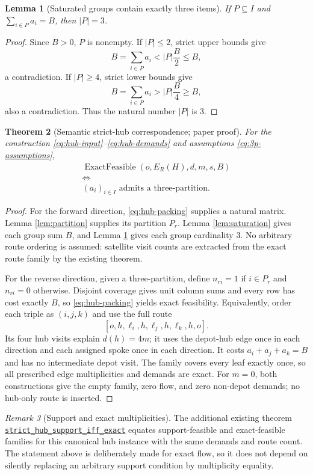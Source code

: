 \documentclass[11pt]{article}
\newtheorem{theorem}{Theorem}[section]
\newtheorem{lemma}[theorem]{Lemma}
\theoremstyle{remark}
\newtheorem{remark}[theorem]{Remark}
\newcommand{\EF}{\operatorname{ExactFeasible}}
\newcommand{\code}[1]{\nolinkurl{#1}}
\newcommand{\src}[2]{\href{https://github.com/huam54925-cpu/uav-routing-certification/blob/1bc992475a9bd515d77245e2bc0471e5ecab2fd5/LeanCompletion/UAV/#1.lean}{#2}}
\begin{document}
\begin{lemma}[Saturated groups contain exactly three items]\label{lem:three}
If $P\subseteq I$ and $\sum_{i\in P}a_i=B$, then $|P|=3$.
\end{lemma}
\begin{proof}
Since $B>0$, $P$ is nonempty. If $|P|\leq2$, strict upper bounds give
\[
 B=\sum_{i\in P}a_i<|P|\frac B2\leq B,
\]
a contradiction. If $|P|\geq4$, strict lower bounds give
\[
 B=\sum_{i\in P}a_i>|P|\frac B4\geq B,
\]
also a contradiction. Thus the natural number $|P|$ is $3$.
\end{proof}

\begin{theorem}[Semantic strict-hub correspondence; paper proof]\label{thm:hub}
For the construction \eqref{eq:hub-input}--\eqref{eq:hub-demands} and assumptions \eqref{eq:3p-assumptions},
\[
 \boxed{\begin{gathered}
   \EF(o,E_R(H),d,m,s,B)\\
   \Longleftrightarrow\\
   (a_i)_{i\in I}\text{ admits a three-partition}.
 \end{gathered}}
\]
\end{theorem}
\begin{proof}
For the forward direction, \eqref{eq:hub-packing} supplies a natural matrix.
Lemma \ref{lem:partition} supplies its partition $P_r$.
Lemma \ref{lem:saturation} gives each group sum $B$, and Lemma \ref{lem:three} gives each group cardinality $3$.
No arbitrary route ordering is assumed: satellite visit counts are extracted from the exact route family by the existing theorem.

For the reverse direction, given a three-partition, define $n_{ri}=1$ if $i\in P_r$ and $n_{ri}=0$ otherwise.
Disjoint coverage gives unit column sums and every row has cost exactly $B$, so \eqref{eq:hub-packing} yields exact feasibility.
Equivalently, order each triple as $(i,j,k)$ and use the full route
\[
 [o,h,\ell_i,h,\ell_j,h,\ell_k,h,o].
\]
Its four hub visits explain $d(h)=4m$; it uses the depot-hub edge once in each direction and each assigned spoke once in each direction.
It costs $a_i+a_j+a_k=B$ and has no intermediate depot visit.
The family covers every leaf exactly once, so all prescribed edge multiplicities and demands are exact.
For $m=0$, both constructions give the empty family, zero flow, and zero non-depot demands; no hub-only route is inserted.
\end{proof}

\begin{remark}[Support and exact multiplicities]
The additional existing theorem
\src{HubSpokeSupportExact}{\code{strict_hub_support_iff_exact}}
equates support-feasible and exact-feasible families for this canonical hub instance with the same demands and route count.
The statement above is deliberately made for exact flow, so it does not depend on silently replacing an arbitrary support condition by multiplicity equality.
\end{remark}
\end{document}
